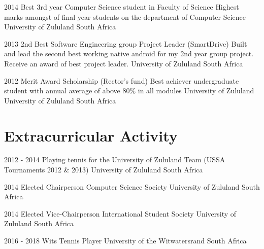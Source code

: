 \documentclass[letterpaper]{moderncv}        %
\begin{document}
\cventry
{2014}
{Best 3rd year Computer Science student in Faculty of Science}
{Highest marks amongst of final year students on the department of Computer Science}
{University of Zululand}
{South Africa}
{}


\cventry
{2013}
{2nd Best Software Engineering group Project Leader (SmartDrive)}
{Built and lead the second best working native android for my 2nd year group project. Receive an award of best project leader.}
{University of Zululand}
{South Africa}
{}

\cventry
{2012}
{Merit Award Scholarship (Rector’s fund)}
{Best achiever undergraduate student with annual average of above 80\% in all modules}
{University of Zululand}
{University of Zululand}
{South Africa}
{}

\section{Extracurricular Activity}
\cventry
{2012 - 2014}
{Playing tennis for the University of Zululand Team (USSA Tournaments 2012 \& 2013)}
{University	of Zululand}
{South Africa}
{}
{}

\cventry
{2014}
{Elected Chairperson Computer Science Society}
{University	of Zululand}
{South Africa}
{}
{}

\cventry
{2014}
{Elected Vice-Chairperson International Student Society}
{University	of Zululand}
{South Africa}
{}
{}

\cventry
{2016 - 2018}
{Wits Tennis Player}
{University	of the Witwatersrand}
{South Africa}
{}
{}
\end{document}
